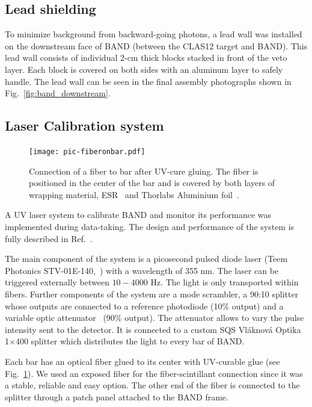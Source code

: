 \documentclass[3p,twocolumn]{elsarticle}
\begin{document}
\subsection{Lead shielding}
To minimize background from backward-going photons, a
lead wall was installed on the downstream face of BAND (between the CLAS12 target
and BAND). This lead wall consists of individual 2-\si{\centi\meter}
thick blocks stacked in front of the veto layer. Each block is covered
on both sides with an aluminum layer to safely handle. The
lead wall can be seen in the final assembly photographs shown in
Fig.~\ref{fig:band_downstream}.


\subsection{Laser Calibration system}
\label{sec:laserystem}
\begin{figure}[tb]
	\centering
		\texttt{[image: pic-fiberonbar.pdf]}
	\caption{Connection of a fiber to bar after UV-cure gluing. The fiber is positioned in the center of the bar and is covered by both layers of wrapping material, ESR~\cite{3MESR} and Thorlabs Aluminium foil~\cite{thorlabsfoil}.}
	\label{fig:pic-fiberonbar}
\end{figure} 
A UV laser system to calibrate BAND and monitor its
performance was implemented during data-taking. 
The design and performance of the system is fully 
described in Ref.~\cite{band-laser}. 

The main component of the system is a picosecond pulsed diode laser 
(Teem Photonics STV-01E-140,~\cite{teem_laser}) with a wavelength 
of 355 \si{\nano\meter}. The laser can be triggered externally between 
$10-4000$ \si{\hertz}. The light is only transported within fibers. Further components of the system are a mode scrambler, a 90:10 splitter whose outputs are connected to a reference photodiode (10\% output) and a variable optic attenuator~\cite{attenuator} (90\% output). The attenuator allows to vary the pulse intensity sent to the detector. It is connected to a custom SQS Vl\'aknov\'a Optika 1$\times$400 splitter which distributes the light to every bar of BAND. 

Each bar has an optical fiber glued to its center with UV-curable glue (see
Fig.~\ref{fig:pic-fiberonbar}). We used an exposed fiber for the fiber-scintillant connection since it was a stable, reliable and easy option. The other end of the fiber is connected to the splitter through a patch panel attached to the BAND frame. 
\end{document}
